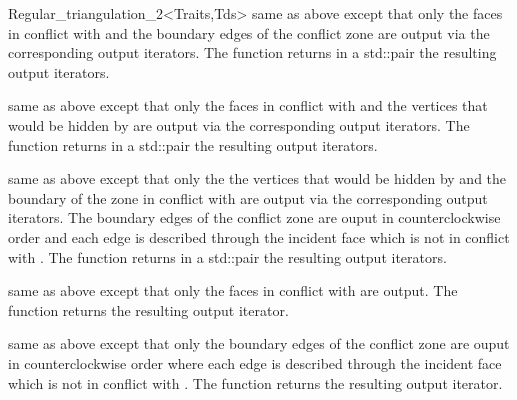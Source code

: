 \begin{ccRefClass}{Regular_triangulation_2<Traits,Tds>}
{
  same as above except that only the faces in conflict with  and 
  the boundary edges of the conflict zone 
  are output via the corresponding output iterators. The function returns 
  in a std::pair the resulting output iterators.}

{
  same as above except that only the faces in conflict with  and 
  the vertices that would be hidden by 
  are output via the corresponding output iterators. The function returns 
  in a std::pair the resulting output iterators.}

{ same as above except that only the the vertices that would be hidden
  by  and the boundary of the zone in conflict with  are
  output via the corresponding output iterators. The boundary edges of
  the conflict zone are ouput in counterclockwise order and each edge
  is described through the incident face which is not in conflict with
  . The function returns in a std::pair the resulting output
  iterators.}

{same as above except that only the faces in conflict with 
are output. The function returns the resulting output iterator.}

{ same as above except that only the boundary edges
of the conflict zone are ouput in counterclockwise order
where each edge is described  through the incident face
which is not in conflict with .
The function returns the resulting output iterator.}


\end{ccRefClass}
